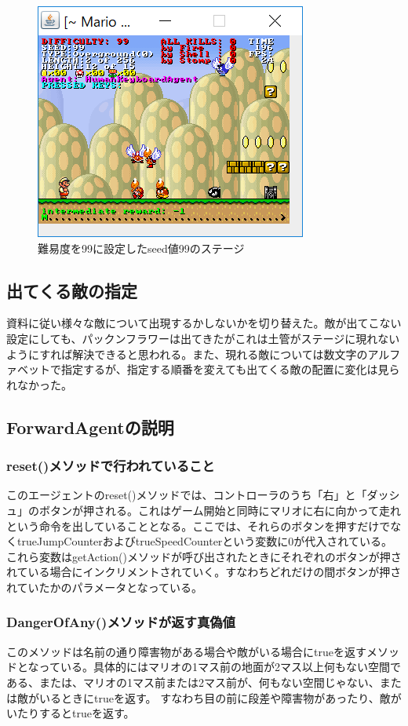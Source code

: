 \documentclass{jsarticle}
\begin{document}
\begin{figure}
	\includegraphics{difficulty99}
	\caption{難易度を99に設定したseed値99のステージ}
\end{figure}

\subsection{出てくる敵の指定}
資料に従い様々な敵について出現するかしないかを切り替えた。敵が出てこない設定にしても、パックンフラワーは出てきたがこれは土管がステージに現れないようにすれば解決できると思われる。また、現れる敵については数文字のアルファベットで指定するが、指定する順番を変えても出てくる敵の配置に変化は見られなかった。
\subsection{ForwardAgentの説明}
\subsubsection{reset()メソッドで行われていること}
このエージェントのreset()メソッドでは、コントローラのうち「右」と「ダッシュ」のボタンが押される。これはゲーム開始と同時にマリオに右に向かって走れという命令を出していることとなる。ここでは、それらのボタンを押すだけでなくtrueJumpCounterおよびtrueSpeedCounterという変数に0が代入されている。これら変数はgetAction()メソッドが呼び出されたときにそれぞれのボタンが押されている場合にインクリメントされていく。すなわちどれだけの間ボタンが押されていたかのパラメータとなっている。
\subsubsection{DangerOfAny()メソッドが返す真偽値}
このメソッドは名前の通り障害物がある場合や敵がいる場合にtrueを返すメソッドとなっている。具体的にはマリオの1マス前の地面が2マス以上何もない空間である、または、マリオの1マス前または2マス前が、何もない空間じゃない、または敵がいるときにtrueを返す。
すなわち目の前に段差や障害物があったり、敵がいたりするとtrueを返す。
\end{document}
